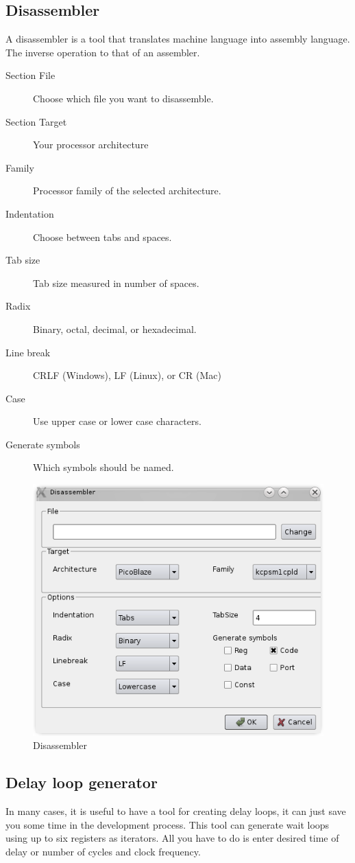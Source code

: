 \subsection{Disassembler}
    A disassembler is a tool that translates machine language into assembly language. The inverse
    operation to that of an assembler.

    \begin{description}
        \item[Section File] Choose which file you want to disassemble.
        \item[Section Target] Your processor architecture
        \item[Family] Processor family of the selected architecture.
        \item[Indentation] Choose between tabs and spaces.
        \item[Tab size] Tab size measured in number of spaces.
        \item[Radix] Binary, octal, decimal, or hexadecimal.
        \item[Line break] CRLF (Windows), LF (Linux), or CR (Mac)
        \item[Case] Use upper case or lower case characters.
        \item[Generate symbols] Which symbols should be named.
    \end{description}

    \begin{figure}[h]
        \centering{}
        \includegraphics[width=.5\textwidth]{img/disassembler_window.png}
        \caption{Disassembler}
    \end{figure}

\subsection{Delay loop generator}
    In many cases, it is useful to have a tool for creating delay loops, it can just save you some time in the
    development process. This tool can generate wait loops using up to six registers as iterators. All you have to do is
    enter desired time of delay or number of cycles and clock frequency.

